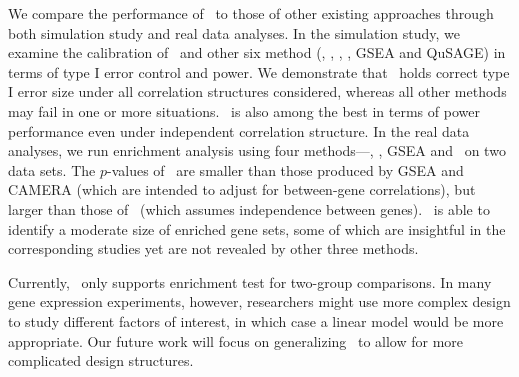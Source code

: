 	We compare the performance of \OurMethod~to those of other existing approaches through both 
	simulation study and real data analyses. In the simulation study, we examine the calibration 
	of \OurMethod~and other six method (\gent, \genr, \CMT, \CMR, GSEA and QuSAGE) in terms of type 
	I error control and power. We demonstrate that \OurMethod~holds correct type I error size under 
	all correlation structures considered, whereas all other methods may fail in one or more 
	situations. \OurMethod~is also among the best in terms of power performance even under 
	independent correlation structure. In the real data analyses, we run enrichment analysis using 
	four methods---\OurMethod, \CMT, GSEA and \genr~on two data sets.
	The $p$-values of \OurMethod~are smaller than those produced by 
	 GSEA and CAMERA (which are intended to adjust for between-gene correlations), but 
	 larger than those of \genr~(which assumes independence between genes).
	 \OurMethod~is able to identify a moderate size of enriched gene sets, some of which are 
	 insightful in the corresponding studies yet are not revealed by other three methods.
	
	Currently, \OurMethod~only supports enrichment test for two-group comparisons. In
	many gene expression experiments, however, researchers might use more complex design to study
	different factors of interest, in which case a linear model would be more appropriate. Our
	future work will focus on generalizing \OurMethod~to allow for more complicated design 
	structures. 
	
